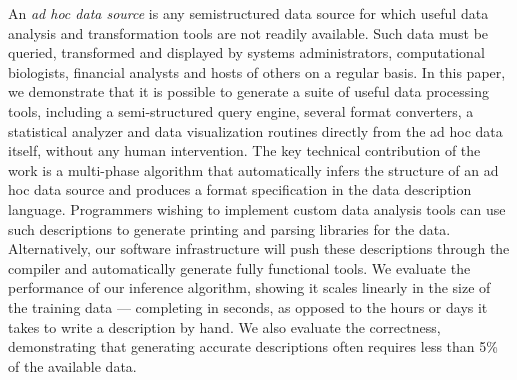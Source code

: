 An {\em ad hoc data source} is any semistructured data source for
which useful data analysis and transformation tools are not 
readily available.  Such data must be queried, transformed and displayed by
systems administrators, computational biologists, financial analysts
and hosts of others on a regular basis.  
In this paper, we demonstrate that it is possible to generate a suite
of useful data processing tools, including a semi-structured query
engine, several format converters, a statistical analyzer and data
visualization routines directly from the ad hoc data itself, 
without any human intervention.  
The key technical contribution of the work is a multi-phase algorithm
that automatically infers the structure of an ad hoc data source and
produces a format specification in the \pads{} data description
language.  
Programmers wishing to implement custom data analysis tools
can use such descriptions to generate printing and parsing libraries
for the data.  Alternatively,  our software infrastructure will
push these descriptions through the \pads{} compiler and automatically
generate fully functional tools.  We evaluate the performance of
our inference algorithm, showing it scales linearly
in the size of the training data --- completing in seconds, as opposed
to the hours or days it takes to write a description by hand.
We also evaluate the correctness, demonstrating that 
generating accurate descriptions often requires less than 5\% of the
available data.